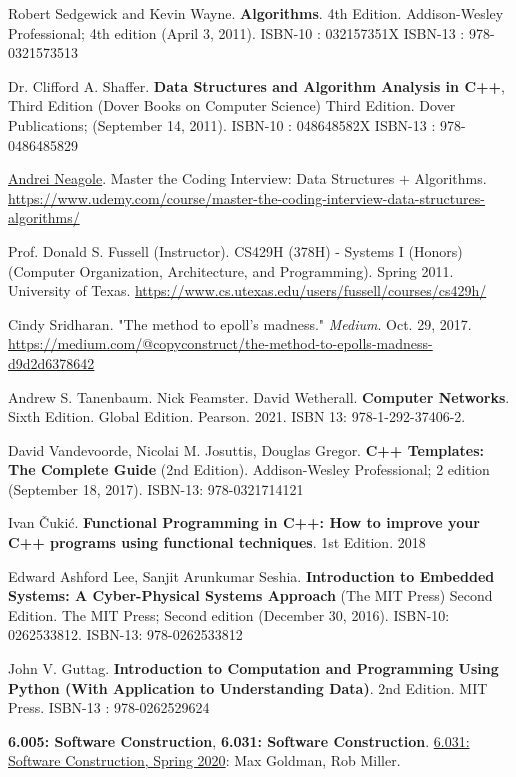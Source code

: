 \documentclass[10pt]{amsart}
\begin{document}
\begin{thebibliography}{9}
Robert Sedgewick and Kevin Wayne. \textbf{Algorithms}. 4th Edition. Addison-Wesley Professional; 4th edition (April 3, 2011). ISBN-10 : 032157351X
ISBN-13 : 978-0321573513 

Dr. Clifford A. Shaffer. \textbf{Data Structures and Algorithm Analysis in C++}, Third Edition (Dover Books on Computer Science) Third Edition. Dover Publications; (September 14, 2011). ISBN-10 : 048648582X ISBN-13 : 978-0486485829 


\href{https://www.udemy.com/course/master-the-coding-interview-data-structures-algorithms/#instructor-1}{Andrei Neagole}. Master the Coding Interview: Data Structures $+$ Algorithms. 
\url{https://www.udemy.com/course/master-the-coding-interview-data-structures-algorithms/}

Prof. Donald S. Fussell (Instructor). CS429H (378H) - Systems I (Honors) (Computer Organization, Architecture, and Programming). Spring 2011. University of Texas. \url{https://www.cs.utexas.edu/users/fussell/courses/cs429h/}

 Cindy Sridharan. "The method to epoll's madness." \emph{Medium}. Oct. 29, 2017. \url{https://medium.com/@copyconstruct/the-method-to-epolls-madness-d9d2d6378642}

Andrew S. Tanenbaum. Nick Feamster. David Wetherall. \textbf{Computer Networks}. Sixth Edition. Global Edition. Pearson. 2021. ISBN 13: 978-1-292-37406-2.

David Vandevoorde, Nicolai M. Josuttis, Douglas Gregor. \textbf{C++ Templates: The Complete Guide} (2nd Edition). Addison-Wesley Professional; 2 edition (September 18, 2017). ISBN-13: 978-0321714121

Ivan \v{C}uki\'{c}. \textbf{Functional Programming in C++: How to improve your C++ programs using functional techniques}. 1st Edition. 2018


Edward Ashford Lee, Sanjit Arunkumar Seshia. \textbf{Introduction to Embedded Systems: A Cyber-Physical Systems Approach} (The MIT Press) Second Edition. The MIT Press; Second edition (December 30, 2016). ISBN-10: 0262533812. ISBN-13: 978-0262533812

John V. Guttag. \textbf{Introduction to Computation and Programming Using Python (With Application to Understanding Data)}. 2nd Edition. 	MIT Press.  ISBN-13 : 978-0262529624 

\textbf{6.005: Software Construction}, \textbf{6.031: Software Construction}. \href{http://web.mit.edu/6.031/www/sp20/}{6.031: Software Construction, Spring 2020}: Max Goldman, Rob Miller.



\end{thebibliography}
\end{document}
